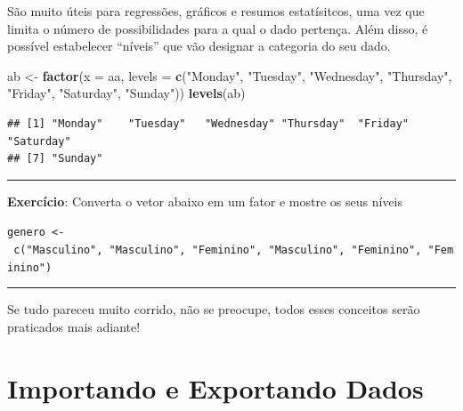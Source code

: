 \documentclass[]{book}
\newenvironment{Shaded}{\begin{snugshade}}{\end{snugshade}}
\newcommand{\KeywordTok}[1]{\textcolor[rgb]{0.13,0.29,0.53}{\textbf{#1}}}
\newcommand{\DataTypeTok}[1]{\textcolor[rgb]{0.13,0.29,0.53}{#1}}
\newcommand{\StringTok}[1]{\textcolor[rgb]{0.31,0.60,0.02}{#1}}
\newcommand{\CommentTok}[1]{\textcolor[rgb]{0.56,0.35,0.01}{\textit{#1}}}
\newcommand{\OtherTok}[1]{\textcolor[rgb]{0.56,0.35,0.01}{#1}}
\newcommand{\OperatorTok}[1]{\textcolor[rgb]{0.81,0.36,0.00}{\textbf{#1}}}
\newcommand{\NormalTok}[1]{#1}
\theoremstyle{definition}
\theoremstyle{definition}
\theoremstyle{definition}
\theoremstyle{remark}
\begin{document}
São muito úteis para regressões, gráficos e resumos estatísitcos, uma
vez que limita o número de possibilidades para a qual o dado pertença.
Além disso, é possível estabelecer ``níveis'' que vão designar a
categoria do seu dado.

\begin{Shaded}
\begin{Highlighting}[]
\NormalTok{ab <-}\StringTok{ }\KeywordTok{factor}\NormalTok{(}\DataTypeTok{x =}\NormalTok{ aa,}
             \DataTypeTok{levels =} \KeywordTok{c}\NormalTok{(}\StringTok{"Monday"}\NormalTok{, }\StringTok{"Tuesday"}\NormalTok{,  }\StringTok{"Wednesday"}\NormalTok{,  }\StringTok{"Thursday"}\NormalTok{,}
                        \StringTok{"Friday"}\NormalTok{, }\StringTok{"Saturday"}\NormalTok{, }\StringTok{"Sunday"}\NormalTok{))}
\KeywordTok{levels}\NormalTok{(ab)}
\end{Highlighting}
\end{Shaded}

\begin{verbatim}
## [1] "Monday"    "Tuesday"   "Wednesday" "Thursday"  "Friday"    "Saturday" 
## [7] "Sunday"
\end{verbatim}

\begin{center}\rule{0.5\linewidth}{\linethickness}\end{center}

{\textbf{Exercício}: Converta o vetor abaixo em um fator e mostre os
seus níveis}

\texttt{genero\ \textless{}-\ c("Masculino",\ "Masculino",\ "Feminino",\ "Masculino",\ "Feminino",\ "Feminino")}

\begin{center}\rule{0.5\linewidth}{\linethickness}\end{center}

Se tudo pareceu muito corrido, não se preocupe, todos esses conceitos
serão praticados mais adiante!

\begin{Shaded}
\end{Shaded}

\chapter{Importando e Exportando
Dados}\label{importando-e-exportando-dados}
\end{document}

